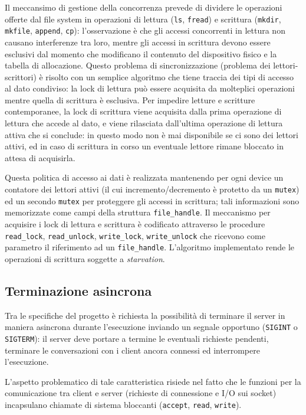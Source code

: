 \documentclass[11pt,oneside,a4paper]{article}
\begin{document}
Il meccansimo di gestione della concorrenza prevede di dividere le operazioni offerte dal file system in operazioni di lettura (\texttt{ls}, \texttt{fread}) e scrittura (\texttt{mkdir}, \texttt{mkfile}, \texttt{append}, \texttt{cp}): l'osservazione è che gli accessi concorrenti in lettura non causano interferenze tra loro, mentre gli accessi in scrittura devono essere esclusivi dal momento che modificano il contenuto del dispositivo fisico e la tabella di allocazione. Questo problema di sincronizzazione (problema dei lettori-scrittori) è risolto con un semplice algoritmo che tiene traccia dei tipi di accesso al dato condiviso: la lock di lettura può essere acquisita da molteplici operazioni mentre quella di scrittura è esclusiva. Per impedire letture e scritture contemporanee, la lock di scrittura viene acquisita dalla prima operazione di lettura che accede al dato, e viene rilasciata dall'ultima operazione di lettura attiva che si conclude: in questo modo non è mai disponibile se ci sono dei lettori attivi, ed in caso di scrittura in corso un eventuale lettore rimane bloccato in attesa di acquisirla.

Questa politica di accesso ai dati è realizzata mantenendo per ogni device un contatore dei lettori attivi (il cui incremento/decremento è protetto da un \texttt{mutex}) ed un secondo \texttt{mutex} per proteggere gli accessi in scrittura; tali informazioni sono memorizzate come campi della struttura \texttt{file\_handle}. Il meccanismo per acquisire i lock di lettura e scrittura è codificato attraverso le procedure \texttt{read\_lock}, \texttt{read\_unlock}, \texttt{write\_lock}, \texttt{write\_unlock} che ricevono come parametro il riferimento ad un \texttt{file\_handle}. L'algoritmo implementato rende le operazioni di scrittura soggette a \emph{starvation}.

\subsection{Terminazione asincrona}
Tra le specifiche del progetto è richiesta la possibilità di terminare il server in maniera asincrona durante l'esecuzione inviando un segnale opportuno (\texttt{SIGINT} o \texttt{SIGTERM}): il server deve portare a termine le eventuali richieste pendenti, terminare le conversazioni con i client ancora connessi ed interrompere l'esecuzione.

L'aspetto problematico di tale caratteristica risiede nel fatto che le funzioni per la comunicazione tra client e server (richieste di connessione e I/O sui socket) incapsulano chiamate di sistema bloccanti (\texttt{accept}, \texttt{read}, \texttt{write}).
\end{document}
